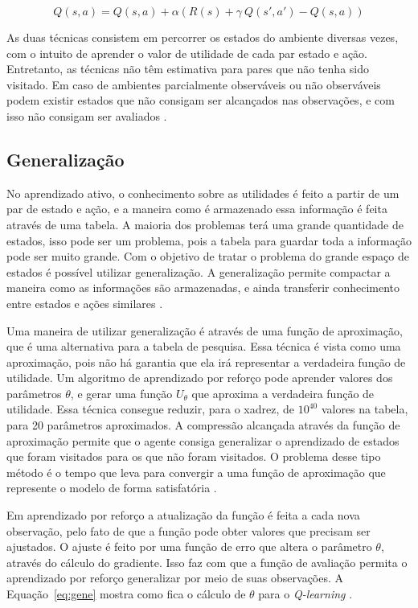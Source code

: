 \begin{equation}
\label{eq:sarsa}	
Q(s, a) = Q(s, a) + \alpha (R(s) + \gamma~Q(s', a') - Q(s, a))
\end{equation}

As duas técnicas consistem em percorrer os estados do ambiente diversas vezes, com o intuito de aprender o valor de utilidade de cada par estado e ação. Entretanto, as técnicas não têm estimativa para pares que não tenha sido visitado. Em caso de ambientes parcialmente observáveis ou não observáveis podem existir estados que não consigam ser alcançados nas observações, e com isso não consigam ser avaliados \cite{Mitchell1997ML}.   

\subsection{Generalização} 
 
No aprendizado ativo, o conhecimento sobre as utilidades é feito a partir de um par de estado e ação, e a maneira como é armazenado essa informação é feita através de uma tabela. A maioria dos problemas terá uma grande quantidade de estados, isso pode ser um problema, pois a tabela para guardar toda a informação pode ser muito grande. Com o objetivo de tratar o problema do grande espaço de estados é possível utilizar generalização. A generalização permite compactar a maneira como as informações são armazenadas, e ainda transferir conhecimento entre estados e ações similares \cite{Mitchell1997ML, kaelbling1996reinforcement}.

Uma maneira de utilizar generalização é através de uma função de aproximação, que é uma alternativa para a tabela de pesquisa. Essa técnica é vista como uma aproximação, pois não há garantia que ela irá representar a verdadeira função de utilidade. Um algoritmo de aprendizado por reforço pode aprender valores dos parâmetros $\theta$, e gerar uma função $U_{\theta}$ que aproxima a verdadeira função de utilidade. Essa técnica consegue reduzir, para o xadrez, de $10^{40}$ valores na tabela, para 20 parâmetros aproximados. A compressão alcançada através da função de aproximação permite que o agente consiga generalizar o aprendizado de estados que foram visitados para os que não foram visitados. O problema desse tipo método é o tempo que leva para convergir a uma função de aproximação que represente o modelo de forma satisfatória \cite{intelligence2003modern}.

Em aprendizado por reforço a atualização da função é feita a cada nova observação, pelo fato de que a função pode obter valores que precisam ser ajustados. O ajuste é feito por uma função de erro que altera o parâmetro $\theta$, através do cálculo do gradiente. Isso faz com que a função de avaliação permita o aprendizado por reforço generalizar por meio de suas observações. A Equação~\ref{eq:gene} mostra como fica o cálculo de $\theta$ para o \textit{Q-learning} \cite{intelligence2003modern}.

